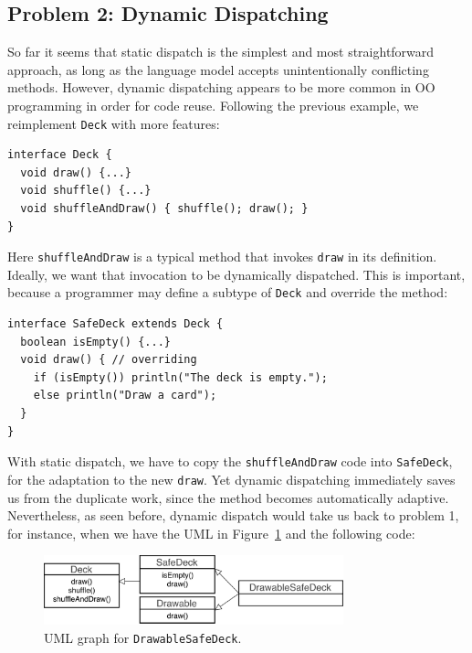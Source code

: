 \subsection{Problem 2: Dynamic Dispatching}
So far it seems that static dispatch is the simplest and most straightforward approach,
as long as the language model accepts unintentionally conflicting methods. However, dynamic
dispatching appears to be more common in OO programming in order for code reuse. Following the previous example,
we reimplement \lstinline|Deck| with more features:

\vspace{3pt}\begin{lstlisting}
interface Deck {
  void draw() {...}
  void shuffle() {...}
  void shuffleAndDraw() { shuffle(); draw(); }
}
\end{lstlisting}\vspace{3pt}
Here \lstinline|shuffleAndDraw| is a typical method that invokes \lstinline|draw| in its definition. Ideally,
we want that invocation to be dynamically dispatched. This is important, because a programmer may define a subtype
of \lstinline|Deck| and override the method:

\vspace{3pt}\begin{lstlisting}
interface SafeDeck extends Deck {
  boolean isEmpty() {...}
  void draw() { // overriding
    if (isEmpty()) println("The deck is empty.");
    else println("Draw a card");
  }
}
\end{lstlisting}\vspace{3pt}
With static dispatch, we have to copy the \lstinline|shuffleAndDraw| code into \lstinline|SafeDeck|,
for the adaptation to the new \lstinline|draw|. Yet dynamic dispatching immediately saves us from the duplicate work,
since the method becomes automatically adaptive. Nevertheless, as seen before, dynamic dispatch would take us back to problem
1, for instance, when we
have the UML in Figure~\ref{fig:drawablesafedeck} and the following code:

\begin{figure}[t]
	\saveSpaceFig
	\centering
	\includegraphics[height=2cm]{pics/DrawableSafeDeck.pdf}
	\caption{UML graph for \lstinline|DrawableSafeDeck|.}\label{fig:drawablesafedeck}
	\saveSpaceFig
\end{figure}

